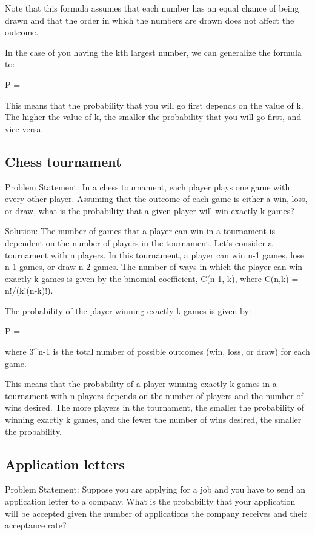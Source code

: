 \documentclass[12pt, a4paper, oneside]{article}
\begin{document}
Note that this formula assumes that each number has an equal chance of being drawn and that the order in which the numbers are drawn does not affect the outcome.

In the case of you having the kth largest number, we can generalize the formula to:

P = 

This means that the probability that you will go first depends on the value of k. The higher the value of k, the smaller the probability that you will go first, and vice versa.




\subsection{ Chess tournament }
Problem Statement:
In a chess tournament, each player plays one game with every other player. Assuming that the outcome of each game is either a win, loss, or draw, what is the probability that a given player will win exactly k games?

Solution:
The number of games that a player can win in a tournament is dependent on the number of players in the tournament. Let's consider a tournament with n players. In this tournament, a player can win n-1 games, lose n-1 games, or draw n-2 games. The number of ways in which the player can win exactly k games is given by the binomial coefficient, C(n-1, k), where C(n,k) = n!/(k!(n-k)!).

The probability of the player winning exactly k games is given by:

P = 

where 3^{n-1} is the total number of possible outcomes (win, loss, or draw) for each game.

This means that the probability of a player winning exactly k games in a tournament with n players depends on the number of players and the number of wins desired. The more players in the tournament, the smaller the probability of winning exactly k games, and the fewer the number of wins desired, the smaller the probability.

\subsection{ Application letters }
Problem Statement:
Suppose you are applying for a job and you have to send an application letter to a company. What is the probability that your application will be accepted given the number of applications the company receives and their acceptance rate?
\end{document}
